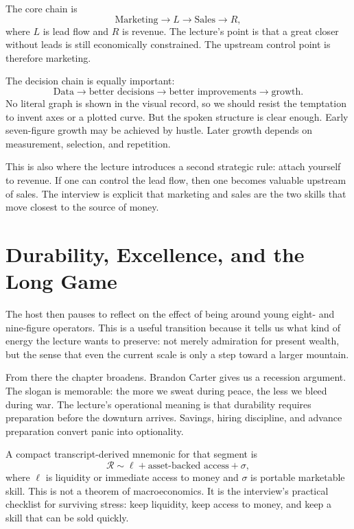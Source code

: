 The core chain is
\begin{equation}
\text{Marketing} \rightarrow L \rightarrow \text{Sales} \rightarrow R,
\end{equation}
where \(L\) is lead flow and \(R\) is revenue. The lecture's point is that a great closer without leads is still economically constrained. The upstream control point is therefore marketing.

The decision chain is equally important:
\begin{equation}
\text{Data} \rightarrow \text{better decisions} \rightarrow \text{better improvements} \rightarrow \text{growth}.
\end{equation}
No literal graph is shown in the visual record, so we should resist the temptation to invent axes or a plotted curve. But the spoken structure is clear enough. Early seven-figure growth may be achieved by hustle. Later growth depends on measurement, selection, and repetition.

This is also where the lecture introduces a second strategic rule: attach yourself to revenue. If one can control the lead flow, then one becomes valuable upstream of sales. The interview is explicit that marketing and sales are the two skills that move closest to the source of money.

\section{Durability, Excellence, and the Long Game}

The host then pauses to reflect on the effect of being around young eight- and nine-figure operators. This is a useful transition because it tells us what kind of energy the lecture wants to preserve: not merely admiration for present wealth, but the sense that even the current scale is only a step toward a larger mountain.

From there the chapter broadens. Brandon Carter gives us a recession argument. The slogan is memorable: the more we sweat during peace, the less we bleed during war. The lecture's operational meaning is that durability requires preparation before the downturn arrives. Savings, hiring discipline, and advance preparation convert panic into optionality.

A compact transcript-derived mnemonic for that segment is
\begin{equation}
\mathcal{R} \sim \ell + \text{asset-backed access} + \sigma,
\end{equation}
where \(\ell\) is liquidity or immediate access to money and \(\sigma\) is portable marketable skill. This is not a theorem of macroeconomics. It is the interview's practical checklist for surviving stress: keep liquidity, keep access to money, and keep a skill that can be sold quickly.

